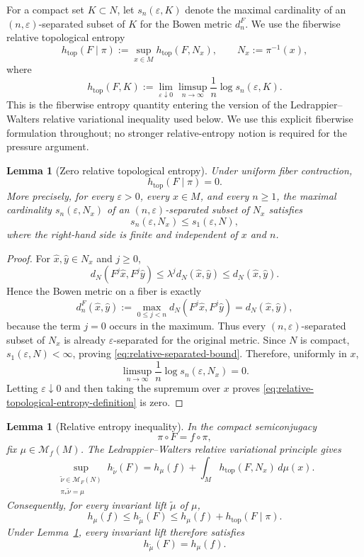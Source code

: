 \documentclass[11pt,a4paper]{article}
\newtheorem{lemma}[theorem]{Lemma}
\newcommand{\M}{\mathcal M}
\newcommand{\eps}{\varepsilon}
\begin{document}
For a compact set $K\subset N$, let $s_n(\eps,K)$ denote the maximal
cardinality of an $(n,\eps)$-separated subset of $K$ for the Bowen metric
$d_n^F$. We use the fiberwise relative topological entropy
\begin{equation}
h_{\mathrm{top}}(F\mid\pi)
:=\sup_{x\in M} h_{\mathrm{top}}(F,N_x),
\qquad N_x:=\pi^{-1}(x),
\label{eq:relative-topological-entropy-definition}
\end{equation}
where
\[
h_{\mathrm{top}}(F,K)
:=\lim_{\eps\downarrow0}\limsup_{n\to\infty}
\frac1n\log s_n(\eps,K).
\]
This is the fiberwise entropy quantity entering the version of the
Ledrappier--Walters relative variational inequality used below. We use this
explicit fiberwise formulation throughout; no stronger relative-entropy
notion is required for the pressure argument.

\begin{lemma}[Zero relative topological entropy]
\label{lem:relative-zero}
Under uniform fiber contraction,
\[
\boxed{h_{\mathrm{top}}(F\mid\pi)=0.}
\]
More precisely, for every $\eps>0$, every $x\in M$, and every $n\ge1$,
the maximal cardinality $s_n(\eps,N_x)$ of an $(n,\eps)$-separated subset
of $N_x$ satisfies
\begin{equation}
 s_n(\eps,N_x)\le s_1(\eps,N),
 \label{eq:relative-separated-bound}
\end{equation}
where the right-hand side is finite and independent of $x$ and $n$.
\end{lemma}

\begin{proof}
For $\hat x,\hat y\in N_x$ and $j\ge0$,
\[
d_N(F^j\hat x,F^j\hat y)\le\lambda^j d_N(\hat x,\hat y)
\le d_N(\hat x,\hat y).
\]
Hence the Bowen metric on a fiber is exactly
\[
d_n^F(\hat x,\hat y)
:=\max_{0\le j<n}d_N(F^j\hat x,F^j\hat y)
=d_N(\hat x,\hat y),
\]
because the term $j=0$ occurs in the maximum. Thus every
$(n,\eps)$-separated subset of $N_x$ is already $\eps$-separated for the
original metric. Since $N$ is compact, $s_1(\eps,N)<\infty$, proving
\eqref{eq:relative-separated-bound}. Therefore, uniformly in $x$,
\[
\limsup_{n\to\infty}\frac1n\log s_n(\eps,N_x)=0.
\]
Letting $\eps\downarrow0$ and then taking the supremum over $x$ proves
\eqref{eq:relative-topological-entropy-definition} is zero.
\end{proof}

\begin{lemma}[Relative entropy inequality]
\label{lem:LW-relative}
In the compact semiconjugacy
\[
\pi\circ F=f\circ\pi,
\]
fix $\mu\in\M_f(M)$. The Ledrappier--Walters relative variational principle
gives
\begin{equation}
\sup_{\substack{\widetilde\nu\in\M_F(N)\\ \pi_*\widetilde\nu=\mu}}
 h_{\widetilde\nu}(F)
=
h_\mu(f)+\int_M h_{\mathrm{top}}(F,N_x)\,d\mu(x).
\label{eq:LW-exact-relative}
\end{equation}
Consequently, for every invariant lift $\widetilde\mu$ of $\mu$,
\[
h_\mu(f)\le h_{\widetilde\mu}(F)
\le h_\mu(f)+h_{\mathrm{top}}(F\mid\pi).
\]
Under Lemma~\ref{lem:relative-zero}, every invariant lift therefore satisfies
\[
h_{\widetilde\mu}(F)=h_\mu(f).
\]
\end{lemma}
\end{document}
